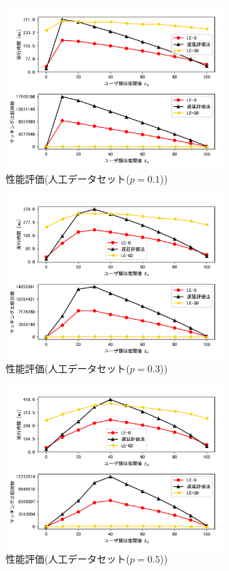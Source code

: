 \begin{figure}[H]
    \centering
    \includegraphics[width=8.3cm]{eimg/exp1_1.png}
    \caption{性能評価(人工データセット($p=0.1$))}
    \label{fig:exp1_art_1}
\end{figure}
\begin{figure}[H]
    \centering
    \includegraphics[width=8.3cm]{eimg/exp1_3.png}
    \caption{性能評価(人工データセット($p=0.3$))}
    \label{fig:exp1_art_3}
\end{figure}
\begin{figure}[H]
    \centering
    \includegraphics[width=8.3cm]{eimg/exp1_5.png}
    \caption{性能評価(人工データセット($p=0.5$))}
    \label{fig:exp1_art_5}
\end{figure}
